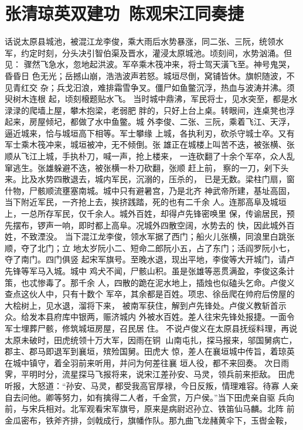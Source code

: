 \chapter{张清琼英双建功~陈观宋江同奏捷}

话说太原县城池，被混江龙李俊，乘大雨后水势暴涨，同二张、三阮，统领水
军，约定时刻，分头决引智伯渠及晋水，灌浸太原城池。顷刻间，水势汹涌。但见：
骤然飞急水，忽地起洪波。军卒乘木筏冲来，将士驾天潢飞至。神号鬼哭，昏昏日
色无光；岳撼山崩，浩浩波声若怒。城垣尽倒，窝铺皆休。旗帜随波，不见青红交
杂；兵戈汩浪，难排霜雪争叉。僵尸如鱼鳖沉浮，热血与波涛并沸。须臾树木连根
起，顷刻榱题贴水飞。
当时城中鼎沸，军民将士，见水突至，都是水渌渌的爬墙上屋，攀木抱梁，老弱肥
胖的，只好上台上桌。转眼间，连桌凳也浮起来，房屋倾圮，都做了水中鱼鳖。城
外李俊、二张、三阮，乘着飞江、天浮，逼近城来，恰与城垣高下相等。军士攀缘
上城，各执利刃，砍杀守城士卒。又有军士乘木筏冲来，城垣被冲，无不倾倒。张
雄正在城楼上叫苦不迭，被张横、张顺从飞江上城，手执朴刀，喊一声，抢上楼来，
一连砍翻了十余个军卒，众人乱窜逃生。张雄躲避不迭，被张横一朴刀砍翻，张顺
赶上前，察的一刀，剁下头来。比及水势四散退去，城内军民，沉溺的，压杀的，
已是无数。梁柱门扇，窗什物，尸骸顺流壅塞南城。城中只有避暑宫，乃是北齐
神武帝所建，基址高固，当下附近军民，一齐抢上去，挨挤践踏，死的也有二千余
人。连那高阜及城垣上，一总所存军民，仅千余人。城外百姓，却得卢先锋密唤里
保，传谕居民，预先摆布，锣声一响，即时都上高阜。况城外四散空阔，水势去的
快，因此城外百姓，不致湮没。
当下混江龙李俊，领水军据了西门；船火儿张横，同浪里白跳张顺，夺了北门；立
地太岁阮小二、短命二郎阮小五，占了东门；活阎罗阮小七，夺了南门。四门俱竖
起宋军旗号。至晚水退，现出平地，李俊等大开城门，请卢先锋等军马入城。城中
鸡犬不闻，尸骸山积。虽是张雄等恶贯满盈，李俊这条计策，也忒惨毒了。那千余
人，四散的跪在泥水地上，插烛也似磕头乞命。卢俊义查点这伙人中，只有十数个
军卒，其余都是百姓。项忠、徐岳爬在帅府后傍屋的大桧树上，见水退，溜将下来，
被南军获住，解到卢先锋处。卢俊义教斩首示众。给发本县府库中银两，赈济城内
外被水百姓。差人往宋先锋处报捷。一面令军士埋葬尸骸，修筑城垣房屋，召民居
住。
不说卢俊义在太原县抚绥料理，再说太原未破时，田虎统领十万大军，因雨在铜
山南屯扎，探马报来，邬国舅病亡，郡主、郡马即退军到襄垣，殡殓国舅。田虎大
惊，差人在襄垣城中传旨，着琼英在城中镇守，着全羽前来听用，并问为何差往襄
垣人役，都不来回奏。
次日雨霁，平明时分，流星探马飞报将来，说宋江差孙安、马灵，领兵前来拒敌。
田虎听报，大怒道：“孙安、马灵，都受我高官厚禄，今日反叛，情理难容。待寡
人亲自去问他。卿等努力，如有擒得二人者，千金赏，万户侯。”当下田虎亲自驱
兵向前，与宋兵相对。北军观看宋军旗号，原来是病尉迟孙立、铁笛仙马麟。北阵
前金瓜密布，铁斧齐排，剑戟成行，旗幡作队。那九曲飞龙赭黄伞下，玉辔金鞍，
